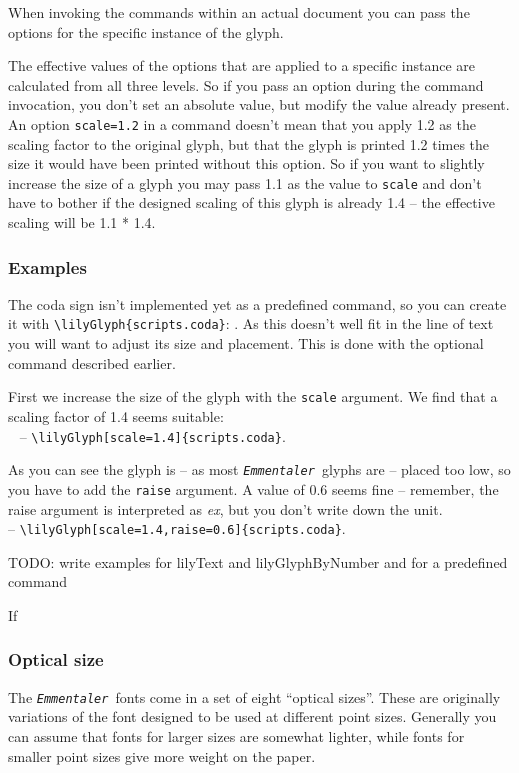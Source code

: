 \documentclass{article}
\newcommand*{\emmentaler}{\texttt{\textit{Emmentaler }}}
\newcommand*{\cmd}[1]{\texttt{\textbackslash #1}}
\begin{document}
When invoking the commands within an actual document you can pass the options for the specific instance of the glyph.

The effective values of the options that are applied to a specific instance are calculated from all three levels. 
So if you pass an option during the command invocation, you don't set an absolute value, but modify the value already present. 
An option \texttt{scale=1.2} in a command doesn't mean that you apply 1.2 as the scaling factor to the original glyph, but that the glyph is printed 1.2 times the size it would have been printed without this option.
So if you want to slightly increase the size of a glyph you may pass 1.1 as the value to \texttt{scale} and don't have to bother if the designed scaling of this glyph is already 1.4 -- the effective scaling will be 1.1 * 1.4.

\subsubsection{Examples}
The coda sign isn't implemented yet as a predefined command, so you can create it with \cmd{lilyGlyph\{scripts.coda\}}: . 
As this doesn't well fit in the line of text you will want to adjust its size and placement.
This is done with the optional command described earlier.

First we increase the size of the glyph with the \texttt{scale} argument. We find that a scaling factor of 1.4 seems suitable:\\
~ -- \cmd{lilyGlyph[scale=1.4]\{scripts.coda\}}.

As you can see the glyph is -- as most \emmentaler glyphs are -- placed too low, so you have to add the \texttt{raise} argument. A value of 0.6 seems fine -- remember, the raise argument is interpreted as \emph{ex}, but you don't write down the unit.\\
 -- \cmd{lilyGlyph[scale=1.4,raise=0.6]\{scripts.coda\}}.

{
\color{red}

\noindent TODO: write examples for lilyText and lilyGlyphByNumber and for a predefined command
}

\bigskip
If

\subsubsection{Optical size}
The \emmentaler fonts come in a set of eight \enquote{optical sizes}.
These are originally variations of the font designed to be used at different point sizes.
Generally you can assume that fonts for larger sizes are somewhat lighter, while fonts for smaller point sizes give more weight on the paper.
\end{document}
